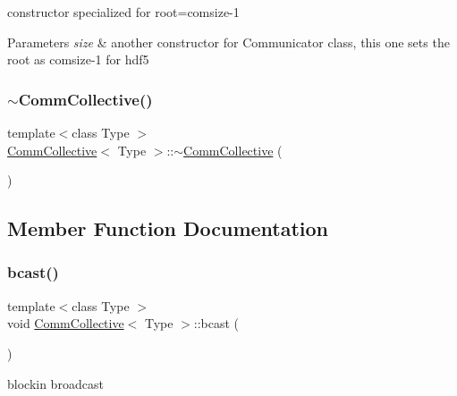 constructor specialized for root=comsize-\/1 
\begin{DoxyParams}{Parameters}
{\em size} & another constructor for Communicator class, this one sets the root as comsize-\/1 for hdf5 \\
\hline
\end{DoxyParams}
\mbox{\label{classCommCollective_ac3c4de03f00fb8f4fa578f23883e4943}} 
\subsubsection{\texorpdfstring{$\sim$\+Comm\+Collective()}{~CommCollective()}}
{\footnotesize\ttfamily template$<$class Type $>$ \\
\mbox{\hyperlink{classCommCollective}{Comm\+Collective}}$<$ Type $>$\+::$\sim$\mbox{\hyperlink{classCommCollective}{Comm\+Collective}} (\begin{DoxyParamCaption}{ }\end{DoxyParamCaption})\hspace{0.3cm}{\ttfamily [inline]}}



\subsection{Member Function Documentation}
\mbox{\label{classCommCollective_a438805e16ba8c74b0682a0bf27b4b0f3}} 
\subsubsection{\texorpdfstring{bcast()}{bcast()}}
{\footnotesize\ttfamily template$<$class Type $>$ \\
void \mbox{\hyperlink{classCommCollective}{Comm\+Collective}}$<$ Type $>$\+::bcast (\begin{DoxyParamCaption}{ }\end{DoxyParamCaption})}

blockin broadcast \mbox{\label{classCommCollective_a2a300899ded8e81afa840f06497716f9}} 
